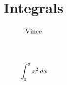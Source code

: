 \documentclass{article}
\title{Integrals}
\author{Vince}
\begin{document}
\maketitle


\[\int_0^{\pi} x^2\,dx\]
\end{document}
